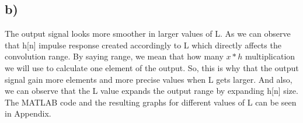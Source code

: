 \documentclass[12pt]{article}
\begin{document}
\subsection*{b)}
The output signal looks more smoother in larger values of L. As we can observe that h[n] impulse response created accordingly to L which directly affects the convolution range. By saying range, we mean that how many \(x*h\) multiplication we will use to calculate one element of the output. So, this is why that the output signal gain more elements and more precise values when L gets larger. And also, we can observe that the L value expands the output range by expanding h[n] size. The MATLAB code and the resulting graphs for different values of L can be seen in Appendix. 

    
\end{document}

